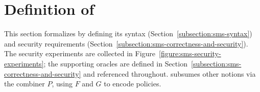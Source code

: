\section{Definition of \SMS}\label{section:sms-definition}

This section formalizes \SMS by defining its syntax
(Section~\ref{subsection:sms-syntax})
and security requirements
(Section~\ref{subsection:sms-correctness-and-security}).
The security experiments are collected in
Figure~\ref{figure:sms-security-experiments};
the supporting oracles are defined in
Section~\ref{subsection:sms-correctness-and-security}
and referenced throughout.
\SMS subsumes other notions via the combiner $P$, 
using $F$ and $G$ to encode policies.



